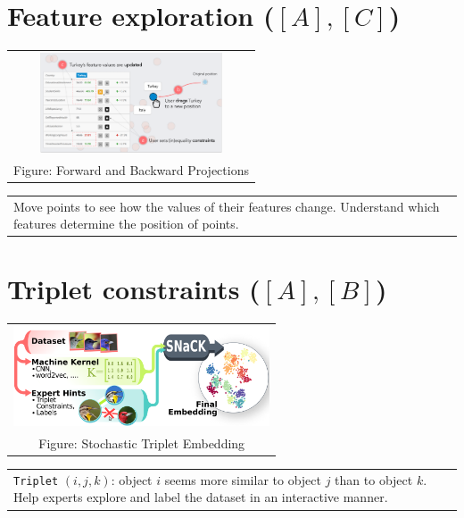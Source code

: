 \documentclass[portrait,final,a0paper]{nadiposter}
\newcommand{\pointer}{\scalebox{1.0}{\ding{43}}}%
\begin{document}
\begin{poster}
{\begin{multicols}{3}
    \section*{\normalsize{Feature exploration ($[A],[C]$)}}
    \begin{center}
        \begin{tabular}{c}
            \includegraphics[height=8em]{poster_NADI_2018/images/eg_forward_backward.png}\\
            \scriptsize{Figure: Forward and Backward Projections \cite{cavallo2017FWBW}}
        \end{tabular}
        \begin{tabular}{p{20em}}
            \quad Move points to see how the values of their features change.
            \pointer
            Understand which features determine the position of points.%
        \end{tabular}
    \end{center}

    \section*{\normalsize{Triplet constraints ($[A],[B]$)}}
    \begin{center}
        \begin{tabular}{c}
            \includegraphics[height=8em]{poster_NADI_2018/images/eg_triplet.png}\\
            \scriptsize{Figure: Stochastic Triplet Embedding \cite{van2012ste}}
        \end{tabular}
        \begin{tabular}{p{22em}}
            \quad\texttt{Triplet} $(i, j, k)$: object $i$ seems more similar to object $j$ than to object $k$.
            \pointer
            Help experts explore and label the dataset in an interactive manner.
        \end{tabular}
    \end{center}


\end{multicols}}
\end{poster}
\end{document}
